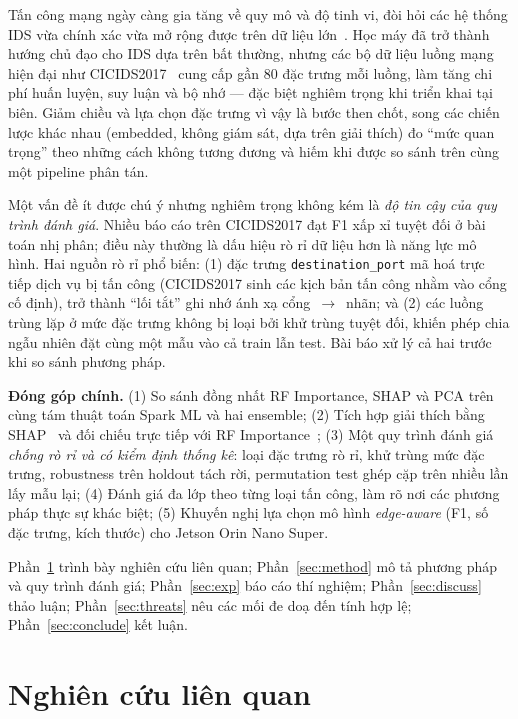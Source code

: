 \documentclass[runningheads]{llncs}
\begin{document}
Tấn công mạng ngày càng gia tăng về quy mô và độ tinh vi, đòi hỏi các hệ thống IDS vừa chính xác vừa mở rộng được trên dữ liệu lớn~\cite{ring2019survey,khraisat2019survey}. Học máy đã trở thành hướng chủ đạo cho IDS dựa trên bất thường, nhưng các bộ dữ liệu luồng mạng hiện đại như CICIDS2017~\cite{sharafaldin2018toward} cung cấp gần 80 đặc trưng mỗi luồng, làm tăng chi phí huấn luyện, suy luận và bộ nhớ --- đặc biệt nghiêm trọng khi triển khai tại biên. Giảm chiều và lựa chọn đặc trưng vì vậy là bước then chốt, song các chiến lược khác nhau (embedded, không giám sát, dựa trên giải thích) đo ``mức quan trọng'' theo những cách không tương đương và hiếm khi được so sánh trên cùng một pipeline phân tán.

Một vấn đề ít được chú ý nhưng nghiêm trọng không kém là \emph{độ tin cậy của quy trình đánh giá}. Nhiều báo cáo trên CICIDS2017 đạt F1 xấp xỉ tuyệt đối ở bài toán nhị phân; điều này thường là dấu hiệu rò rỉ dữ liệu hơn là năng lực mô hình. Hai nguồn rò rỉ phổ biến: (1) đặc trưng \texttt{destination\_port} mã hoá trực tiếp dịch vụ bị tấn công (CICIDS2017 sinh các kịch bản tấn công nhằm vào cổng cố định), trở thành ``lối tắt'' ghi nhớ ánh xạ cổng~$\rightarrow$~nhãn; và (2) các luồng trùng lặp ở mức đặc trưng không bị loại bởi khử trùng tuyệt đối, khiến phép chia ngẫu nhiên đặt cùng một mẫu vào cả train lẫn test. Bài báo xử lý cả hai trước khi so sánh phương pháp.

\textbf{Đóng góp chính.}
(1) So sánh đồng nhất RF Importance, SHAP và PCA trên cùng tám thuật toán Spark ML và hai ensemble;
(2) Tích hợp giải thích bằng SHAP~\cite{lundberg2017unified} và đối chiếu trực tiếp với RF Importance~\cite{breiman2001random};
(3) Một quy trình đánh giá \emph{chống rò rỉ và có kiểm định thống kê}: loại đặc trưng rò rỉ, khử trùng mức đặc trưng, robustness trên holdout tách rời, permutation test ghép cặp trên nhiều lần lấy mẫu lại;
(4) Đánh giá đa lớp theo từng loại tấn công, làm rõ nơi các phương pháp thực sự khác biệt;
(5) Khuyến nghị lựa chọn mô hình \emph{edge-aware} (F1, số đặc trưng, kích thước) cho Jetson Orin Nano Super.

Phần~\ref{sec:related} trình bày nghiên cứu liên quan; Phần~\ref{sec:method} mô tả phương pháp và quy trình đánh giá; Phần~\ref{sec:exp} báo cáo thí nghiệm; Phần~\ref{sec:discuss} thảo luận; Phần~\ref{sec:threats} nêu các mối đe doạ đến tính hợp lệ; Phần~\ref{sec:conclude} kết luận.

\section{Nghiên cứu liên quan}
\label{sec:related}
\end{document}
